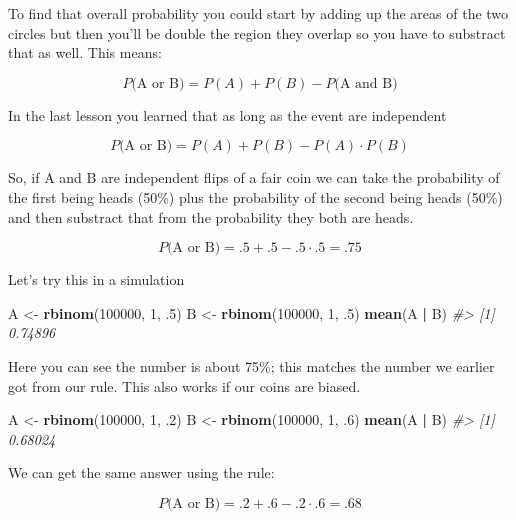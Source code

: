 \documentclass[]{article}
\newenvironment{Shaded}{\begin{snugshade}}{\end{snugshade}}
\newcommand{\CommentTok}[1]{\textcolor[rgb]{0.56,0.35,0.01}{\textit{#1}}}
\newcommand{\DecValTok}[1]{\textcolor[rgb]{0.00,0.00,0.81}{#1}}
\newcommand{\FloatTok}[1]{\textcolor[rgb]{0.00,0.00,0.81}{#1}}
\newcommand{\KeywordTok}[1]{\textcolor[rgb]{0.13,0.29,0.53}{\textbf{#1}}}
\newcommand{\NormalTok}[1]{#1}
\newcommand{\OperatorTok}[1]{\textcolor[rgb]{0.81,0.36,0.00}{\textbf{#1}}}
\newcommand{\StringTok}[1]{\textcolor[rgb]{0.31,0.60,0.02}{#1}}
\begin{document}
To find that overall probability you could start by adding up the areas
of the two circles but then you'll be double the region they overlap so
you have to substract that as well. This means:

\[P\textrm{(A or B)} = P(A) + P(B) - P\textrm{(A and B)}\]

In the last lesson you learned that as long as the event are independent

\[P\textrm{(A or B)} = P(A) + P(B) - P(A) \cdot P(B)\]

So, if A and B are independent flips of a fair coin we can take the
probability of the first being heads (50\%) plus the probability of the
second being heads (50\%) and then substract that from the probability
they both are heads.

\[P\textrm{(A or B)} = .5 + .5 - .5 \cdot .5 = .75\]

Let's try this in a simulation

\begin{Shaded}
\begin{Highlighting}[]
\NormalTok{A <-}\StringTok{ }\KeywordTok{rbinom}\NormalTok{(}\DecValTok{100000}\NormalTok{, }\DecValTok{1}\NormalTok{, }\FloatTok{.5}\NormalTok{)}
\NormalTok{B <-}\StringTok{ }\KeywordTok{rbinom}\NormalTok{(}\DecValTok{100000}\NormalTok{, }\DecValTok{1}\NormalTok{, }\FloatTok{.5}\NormalTok{)}
\KeywordTok{mean}\NormalTok{(A }\OperatorTok{|}\StringTok{ }\NormalTok{B)}
\CommentTok{#> [1] 0.74896}
\end{Highlighting}
\end{Shaded}

Here you can see the number is about 75\%; this matches the number we
earlier got from our rule. This also works if our coins are biased.

\begin{Shaded}
\begin{Highlighting}[]
\NormalTok{A <-}\StringTok{ }\KeywordTok{rbinom}\NormalTok{(}\DecValTok{100000}\NormalTok{, }\DecValTok{1}\NormalTok{, }\FloatTok{.2}\NormalTok{)}
\NormalTok{B <-}\StringTok{ }\KeywordTok{rbinom}\NormalTok{(}\DecValTok{100000}\NormalTok{, }\DecValTok{1}\NormalTok{, }\FloatTok{.6}\NormalTok{)}
\KeywordTok{mean}\NormalTok{(A }\OperatorTok{|}\StringTok{ }\NormalTok{B)}
\CommentTok{#> [1] 0.68024}
\end{Highlighting}
\end{Shaded}

We can get the same answer using the rule:

\[P\textrm{(A or B)} = .2 + .6 - .2 \cdot .6 = .68\]
\end{document}

